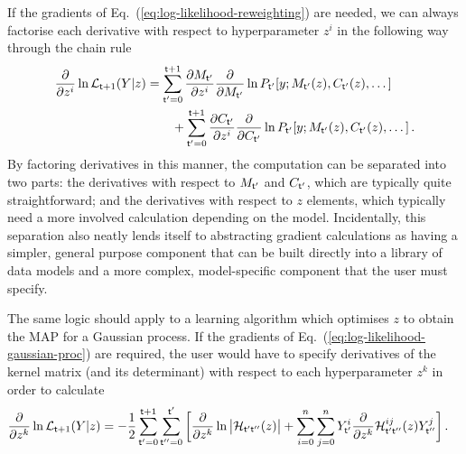 If the gradients of Eq.~(\ref{eq:log-likelihood-reweighting}) are needed, we can always factorise each derivative with respect to hyperparameter $z^i$ in the following way through the chain rule
\begin{align}
\frac{\partial}{\partial z^i}\ln {\cal L}_{{\sf t}+1}(Y \vert z) &= \sum_{{\sf t}'=0}^{{\sf t}+1}\frac{\partial M_{{\sf t}'}}{\partial z^i}\frac{\partial}{\partial M_{{\sf t}'}}\ln P_{{\sf t}'}[y;M_{{\sf t}'}(z),C_{{\sf t}'}(z),\dots ] \nonumber \\
&\qquad + \sum_{{\sf t}'=0}^{{\sf t}+1}\frac{\partial C_{{\sf t}'}}{\partial z^i}\frac{\partial }{\partial C_{{\sf t}'}}\ln P_{{\sf t}'}[y;M_{{\sf t}'}(z),C_{{\sf t}'}(z),\dots ] \,. \label{eq:log-likelihood-reweighting-grad}
\end{align}
By factoring derivatives in this manner, the computation can be separated into two parts: the derivatives with respect to $M_{{\sf t}'}$ and $C_{{\sf t}'}$, which are typically quite straightforward; and the derivatives with respect to $z$ elements, which typically need a more involved calculation depending on the model. Incidentally, this separation also neatly lends itself to abstracting gradient calculations as having a simpler, general purpose component that can be built directly into a library of data models and a more complex, model-specific component that the user must specify.

The same logic should apply to a learning algorithm which optimises $z$ to obtain the MAP for a Gaussian process. If the gradients of Eq.~(\ref{eq:log-likelihood-gaussian-proc}) are required, the user would have to specify derivatives of the kernel matrix (and its determinant) with respect to each hyperparameter $z^k$ in order to calculate
\begin{align}
\frac{\partial}{\partial z^k}\ln {\cal L}_{{\sf t}+1}(Y \vert z) &= -\frac{1}{2}\sum_{{\sf t}'=0}^{{\sf t}+1}\sum_{{\sf t}''=0}^{{\sf t}'} \bigg[ \frac{\partial}{\partial z^k}\ln \big\vert {\cal H}_{{\sf t}'{\sf t}''}(z)\big\vert + \sum_{i=0}^{n}\sum_{j=0}^{n} Y^i_{{\sf t}'} \frac{\partial}{\partial z^k}{\cal H}^{ij}_{{\sf t}'{\sf t}''}(z)Y^j_{{\sf t}''} \bigg] \,. \label{eq:log-likelihood-gaussian-proc-grad}
\end{align}


    